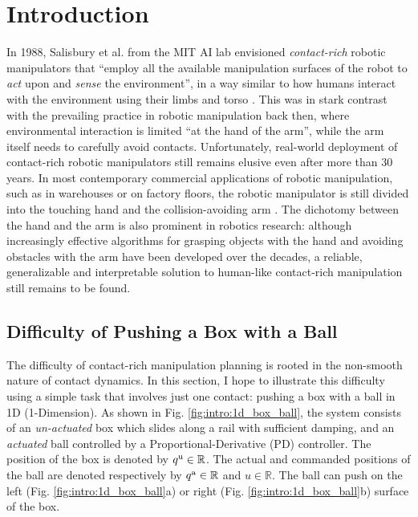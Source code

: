 % 

\chapter{Introduction}
In 1988, Salisbury et al. from the MIT AI lab envisioned \emph{contact-rich} robotic manipulators that ``employ all the available manipulation surfaces of the robot to \emph{act} upon and \emph{sense} the environment'', in a way similar to how humans interact with the environment using their limbs and torso \cite{salisbury1988preliminary}. This was in stark contrast with the prevailing practice in robotic manipulation back then, where environmental interaction is limited ``at the hand of the arm'', while the arm itself needs to carefully avoid contacts. Unfortunately, real-world deployment of contact-rich robotic manipulators still remains elusive even after more than 30 years. In most contemporary commercial applications of robotic manipulation, such as in warehouses or on factory floors, the robotic manipulator is still divided into the touching hand and the collision-avoiding arm \cite{beautifulamazon}. 
The dichotomy between the hand and the arm is also prominent in robotics research: although increasingly effective algorithms for grasping objects with the hand \cite[]{siciliano2008springer} and avoiding obstacles with the arm \cite{lavalle1998rapidly, marcucci2022motion} have been developed over the decades, a reliable, generalizable and interpretable solution to human-like contact-rich manipulation still remains to be found. 

\section{Difficulty of Pushing a Box with a Ball \label{sec:intro:box_ball_system}}
The difficulty of contact-rich manipulation planning is rooted in the non-smooth nature of contact dynamics. In this section, I hope to illustrate this difficulty using a simple task that involves just one contact: pushing a box with a ball in 1D (1-Dimension). 
As shown in Fig. \ref{fig:intro:1d_box_ball}, the system consists of an \emph{un-actuated} box which slides along a rail with sufficient damping, and an \emph{actuated} ball controlled by a Proportional-Derivative (PD) controller. 
The position of the box is denoted by ${q^\mathrm{u}} \in \mathbb{R}$. The actual and commanded positions of the ball are denoted respectively by ${q^\mathrm{a}} \in \mathbb{R}$ and $u \in \mathbb{R}$. 
The ball can push on the left (Fig. \ref{fig:intro:1d_box_ball}a) or right (Fig. \ref{fig:intro:1d_box_ball}b) surface of the box.

